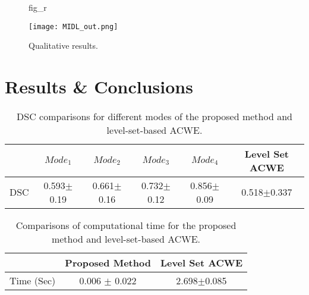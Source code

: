 \documentclass{midl}
\begin{document}
\vspace{2.5mm}

\begin{figure}[!h]
\floatconts
  {fig_r}
  {\caption{Qualitative results.}}
  {\texttt{[image: MIDL\_out.png]}}
\end{figure}
\section{Results \& Conclusions}

\begin{table}[h!]
\centering
\small
    \begin{tabular}{ c | c c c c c}
 \hline
 & $Mode_1$ & $Mode_2$ &$Mode_3$ & $Mode_4$ & Level Set ACWE\\
 \hline
 DSC &  0.593$\pm$0.19 & 0.661$\pm$0.16 & 0.732$\pm$0.12 & 0.856$\pm$0.09 & 0.518$\pm$0.337\\
 \hline
\end{tabular}
\captionsetup{justification=centering}
\caption{DSC comparisons for different modes of the proposed method and level-set-based ACWE.}\label{table_r}
\end{table}

\begin{table}[h!]
\centering
\small
    \begin{tabular}{ c | c c}
 \hline
 & Proposed Method & Level Set ACWE\\
 \hline
 Time (Sec) &  0.006 $\pm$ 0.022 & 2.698$\pm$0.085\\
 \hline
\end{tabular}
\captionsetup{justification=centering}
\caption{Comparisons of computational time for the proposed method and level-set-based ACWE.}\label{table_t}
\end{table}
\end{document}
